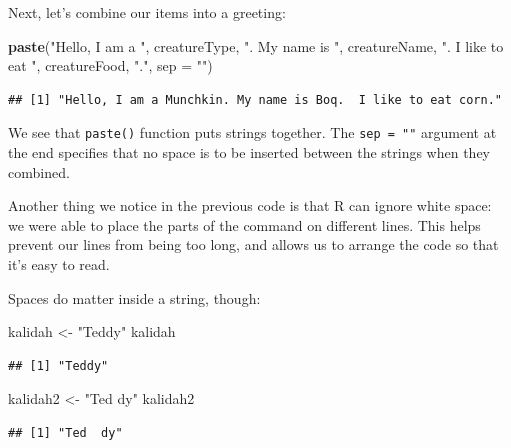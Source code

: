 \documentclass[]{book}
\makeatletter
\newenvironment{Shaded}{\begin{snugshade}}{\end{snugshade}}
\newcommand{\KeywordTok}[1]{\textcolor[rgb]{0.13,0.29,0.53}{\textbf{{#1}}}}
\newcommand{\DataTypeTok}[1]{\textcolor[rgb]{0.13,0.29,0.53}{{#1}}}
\newcommand{\StringTok}[1]{\textcolor[rgb]{0.31,0.60,0.02}{{#1}}}
\newcommand{\NormalTok}[1]{{#1}}
\newenvironment{kframe}{%
\medskip{}
\setlength{\fboxsep}{.8em}
 \def\at@end@of@kframe{}%
 \ifinner\ifhmode%
  \def\at@end@of@kframe{\end{minipage}}%
  \begin{minipage}{\columnwidth}%
 \fi\fi%
 \def\FrameCommand##1{\hskip\@totalleftmargin \hskip-\fboxsep
 \colorbox{shadecolor}{##1}\hskip-\fboxsep
     \hskip-\linewidth \hskip-\@totalleftmargin \hskip\columnwidth}%
 \MakeFramed {\advance\hsize-\width
   \@totalleftmargin\z@ \linewidth\hsize
   \@setminipage}}%
 {\par\unskip\endMakeFramed%
 \at@end@of@kframe}
\renewenvironment{Shaded}{\begin{kframe}}{\end{kframe}}
\theoremstyle{definition}
\theoremstyle{definition}
\theoremstyle{remark}
\makeatother
\begin{document}
Next, let's combine our items into a greeting:

\begin{Shaded}
\begin{Highlighting}[]
\KeywordTok{paste}\NormalTok{(}\StringTok{"Hello, I am a "}\NormalTok{,}
      \NormalTok{creatureType,}
      \StringTok{". My name is "}\NormalTok{,}
      \NormalTok{creatureName,}
      \StringTok{".  I like to eat "}\NormalTok{,}
      \NormalTok{creatureFood,}
      \StringTok{"."}\NormalTok{,}
      \DataTypeTok{sep =} \StringTok{""}\NormalTok{)}
\end{Highlighting}
\end{Shaded}

\begin{verbatim}
## [1] "Hello, I am a Munchkin. My name is Boq.  I like to eat corn."
\end{verbatim}

We see that \texttt{paste()}
function puts strings
together. The \texttt{sep\ =\ ""} argument at the end specifies that no
space is to be inserted between the strings when they combined.

Another thing we notice in the previous code is that R can ignore white
space: we were able to place the parts of the command on different
lines. This helps prevent our lines from being too long, and allows us
to arrange the code so that it's easy to read.

Spaces do matter inside a string, though:

\begin{Shaded}
\begin{Highlighting}[]
\NormalTok{kalidah <-}\StringTok{ "Teddy"}
\NormalTok{kalidah}
\end{Highlighting}
\end{Shaded}

\begin{verbatim}
## [1] "Teddy"
\end{verbatim}

\begin{Shaded}
\begin{Highlighting}[]
\NormalTok{kalidah2 <-}\StringTok{ "Ted  dy"}
\NormalTok{kalidah2}
\end{Highlighting}
\end{Shaded}

\begin{verbatim}
## [1] "Ted  dy"
\end{verbatim}
\end{document}
